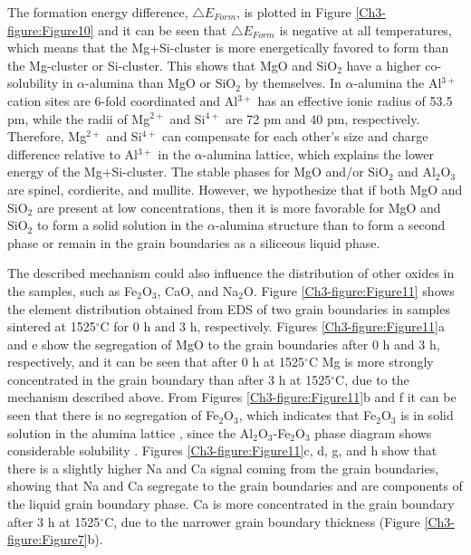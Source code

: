 \noindent The formation energy difference, $\bigtriangleup E_{Form}$, is plotted in Figure \ref{Ch3-figure:Figure10} and it can be seen that $\bigtriangleup E_{Form}$ is negative at all temperatures, which means that the Mg+Si-cluster is more energetically favored to form than the Mg-cluster or Si-cluster. This shows that MgO and SiO$_{2}$ have a higher co-solubility in $\alpha$-alumina than MgO or SiO$_{2}$ by themselves. In $\alpha$-alumina the Al$^{3+}$ cation sites are 6-fold coordinated and Al$^{3+}$ has an effective ionic radius of 53.5 pm, while the radii of Mg$^{2+}$ and Si$^{4+}$ are 72 pm and 40 pm, respectively. Therefore, Mg$^{2+}$ and Si$^{4+}$ can compensate for each other's size and charge difference relative to Al$^{3+}$ in the $\alpha$-alumina lattice, which explains the lower energy of the Mg+Si-cluster. The stable phases for MgO and/or SiO$_{2}$ and Al$_{2}$O$_{3}$ are spinel, cordierite, and mullite. However, we hypothesize that if both MgO and SiO$_{2}$ are present at low concentrations, then it is more favorable for MgO and SiO$_{2}$ to form a solid solution in the $\alpha$-alumina structure than to form a second phase or remain in the grain boundaries as a siliceous liquid phase. 

The described mechanism could also influence the distribution of other oxides in the samples, such as Fe$_{2}$O$_{3}$, CaO, and Na$_{2}$O. Figure \ref{Ch3-figure:Figure11} shows the element distribution obtained from EDS of two grain boundaries in samples sintered at 1525$^{\circ}$C for 0 h and 3 h, respectively. Figures \ref{Ch3-figure:Figure11}a and e show the segregation of MgO to the grain boundaries after 0 h and 3 h, respectively, and it can be seen that after 0 h at 1525$^{\circ}$C Mg is more strongly concentrated in the grain boundary than after 3 h at 1525$^{\circ}$C, due to the mechanism described above. From Figures \ref{Ch3-figure:Figure11}b and f it can be seen that there is no segregation of Fe$_{2}$O$_{3}$, which indicates that Fe$_{2}$O$_{3}$ is in solid solution in the alumina lattice \cite{Atkinson2003}, since the Al$_{2}$O$_{3}$-Fe$_{2}$O$_{3}$ phase diagram shows considerable solubility \cite{Raghavan2010}. Figures \ref{Ch3-figure:Figure11}c, d, g, and h show that there is a slightly higher Na and Ca signal coming from the grain boundaries, showing that Na and Ca segregate to the grain boundaries and are components of the liquid grain boundary phase. Ca is more concentrated in the grain boundary after 3 h at 1525$^{\circ}$C, due to the narrower grain boundary thickness (Figure \ref{Ch3-figure:Figure7}b). 

